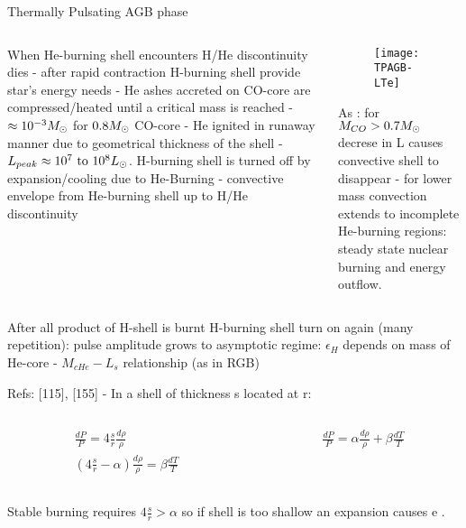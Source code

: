 \begin{frame}{Thermally Pulsating AGB phase}
\begin{columns}[T]
	\begin{column}{0.45\textwidth}
 	When He-burning shell encounters H/He discontinuity dies - after rapid contraction H-burning shell provide star's energy needs - He ashes accreted on CO-core are compressed/heated until a critical mass is reached - $\approx\num{e-3}M_{\odot}$ for $0.8M_{\odot}$ CO-core - He ignited in runaway manner due to geometrical thickness of the shell - $L_{peak}\approx\numrange{e7}{e8}\lsun$.
	H-burning shell is turned off by expansion/cooling due to He-Burning - convective envelope from He-burning shell up to H/He discontinuity
	\end{column}
	\begin{column}{0.50\textwidth}
 		\begin{figure}[!ht]
			\texttt{[image: TPAGB-LTe]}\label{fig:TPAGB-LTe}
		\end{figure}
        As  : for $M_{CO}>0.7M_{\odot}$ decrese in L causes convective shell to disappear - for lower mass convection extends to incomplete He-burning regions: steady state nuclear burning and energy outflow.
\end{column}\end{columns}
After all product of H-shell is burnt H-burning shell turn on again (many repetition): pulse amplitude grows to asymptotic regime: $\epsilon_H$ depends on mass of He-core - $M_{cHe}-L_s$ relationship (as in RGB)
\end{frame}

\begin{frame}{}
Refs: [115], [155] - In a shell of thickness s located at r:
\begin{columns}[T]\begin{column}{0.5\textwidth}
\begin{align*}
&\frac{dP}{P}=4\frac{s}{r}\frac{d\rho}{\rho}\\
&(4\frac{s}{r}-\alpha)\frac{d\rho}{\rho}=\beta\frac{dT}{T}
\end{align*} 
\end{column}
\begin{column}{0.5\textwidth}
\begin{align*}
&\frac{dP}{P}=\alpha\frac{d\rho}{\rho}+\beta\frac{dT}{T}
\end{align*} 
\end{column}\end{columns}
Stable burning requires $4\frac{s}{r}>\alpha$ so if shell is too shallow an expansion causes \xdiminuisce{\rho} e .
\end{frame}

